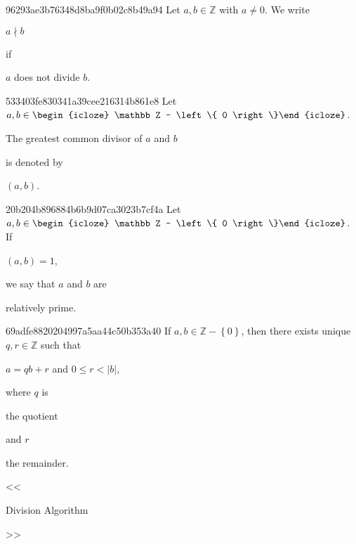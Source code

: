 \begin{note}{96293ae3b76348d8ba9f0b02c8b49a94}
    Let \({ a, b \in \mathbb Z }\) with \({ a \neq 0 }\).
    We write \begin{icloze}{2}\({ a \nmid b }\)\end{icloze} if \begin{icloze}{1}\({ a }\) does not divide \({ b }\).\end{icloze}
\end{note}

\begin{note}{533403fe830341a39cee216314b861e8}
    Let \({ a, b \in \begin{icloze}{3}\mathbb Z - \left\{ 0 \right\}\end{icloze} }\).
    \begin{icloze}{2}The greatest common divisor of \({ a }\) and \({ b }\)\end{icloze} is denoted by \begin{icloze}{1}\({ (a, b) }\).\end{icloze}
\end{note}

\begin{note}{20b204b896884b6b9d07ca3023b7cf4a}
    Let \({ a, b \in \begin{icloze}{3}\mathbb Z - \left\{ 0 \right\}\end{icloze} }\).
    If \begin{icloze}{2}\({ (a, b) = 1 }\),\end{icloze} we say that \({ a }\) and \({ b }\) are \begin{icloze}{1}relatively prime.\end{icloze}
\end{note}

\begin{note}{69adfe8820204997a5aa44c50b353a40}
    If \({ a, b \in \mathbb Z - \left\{ 0 \right\} }\), then there exists unique \({ q, r \in \mathbb Z }\) such that
    \begin{center}
        \({ a = q b + r }\) and \({ 0 \leqslant r < \left\lvert b \right\rvert }\),
    \end{center}
    where \({ q }\) is \begin{icloze}{1}the quotient\end{icloze} and \({ r }\) \begin{icloze}{1}the remainder.\end{icloze}

    \begin{center}
        \tiny
        <<\begin{icloze}{2}Division Algorithm\end{icloze}>>
    \end{center}
\end{note}

